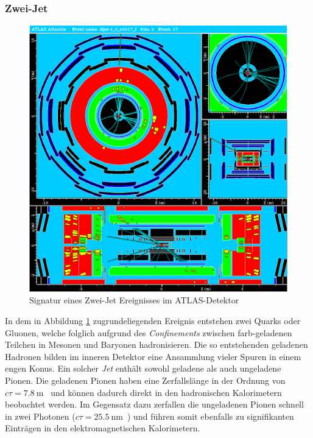 \documentclass[11pt, a4paper]{article}
\numberwithin{equation}{section}
\begin{document}
\clearpage
\subsubsection{Zwei-Jet}
\begin{figure}[htbp]
	\centering
	\includegraphics[width=1.0\textwidth]{./data/atlantis/singlepart_events_new/jets/muon.png}
	\caption{Signatur eines Zwei-Jet Ereignisses im ATLAS-Detektor}
	\label{fig:jets-muon}
\end{figure}
\vfill
\noindent
In dem in Abbildung \ref{fig:jets-muon} zugrundeliegenden Ereignis entstehen zwei Quarks oder Gluonen, welche folglich aufgrund des \textit{Confinements} zwischen farb-geladenen Teilchen in Mesonen und Baryonen hadronisieren.
Die so entstehenden geladenen Hadronen bilden im inneren Detektor eine Ansammlung vieler Spuren in einem engen Konus.
Ein solcher \textit{Jet} enthält sowohl geladene als auch ungeladene Pionen.
Die geladenen Pionen haben eine Zerfallslänge in der Ordnung von $c \tau = \SI{7.8}{\meter}$~\cite{pdg} und können dadurch direkt in den hadronischen Kalorimetern beobachtet werden.
Im Gegensatz dazu zerfallen die ungeladenen Pionen schnell in zwei Photonen ($c \tau = \SI{25.5}{\nano\meter}$~\cite{pdg}) und führen somit ebenfalls zu signifikanten Einträgen in den elektromagnetischen Kalorimetern.
\end{document}
